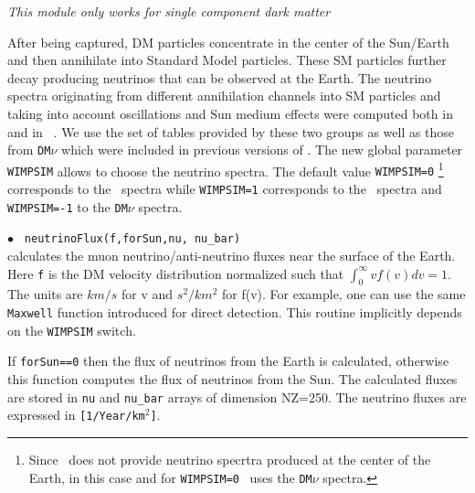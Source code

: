 \documentclass[12pt,a4paper]{article}
\begin{document}
\begin{center}
{\it This module only works for single component dark matter}
\end{center}

After being captured, DM particles concentrate in the center of the Sun/Earth and 
then  annihilate into Standard Model particles. These SM particles further decay producing neutrinos that can be 
observed at the Earth.  The neutrino spectra originating from
different annihilation channels into SM particles and
taking into account oscillations  and Sun medium effects were 
computed both in
\wimpsim~\cite{Blennow:2007tw} and in 
\pppc~\cite{Baratella:2013fya}. We use the set of tables
provided by these two groups as well as  those from  {\tt DM$\nu$}
\cite{Cirelli:2005gh}  which were included in previous versions of \micro.
The new global parameter {\tt WIMPSIM}  allows to
choose  the   neutrino spectra. The default value  {\tt WIMPSIM=0} \footnote{Since \pppc\ does not provide neutrino specrtra produced at the center of the
Earth, in this case  and for {\tt WIMPSIM=0} \micro\ uses the {\tt DM$\nu$} spectra.}
corresponds to the \pppc\ spectra while  {\tt WIMPSIM=1} corresponds to the
\wimpsim\  spectra and  {\tt WIMPSIM=-1}  to the 
 {\tt DM$\nu$} spectra. 
  
  
\noindent
$\bullet$ \verb| neutrinoFlux(f,forSun,nu, nu_bar)|\\
calculates the muon neutrino/anti-neutrino  fluxes  near the surface of the Earth. 
Here  \verb|f|  is  the DM velocity distribution   normalized such that 
$ \int_0^{\infty} v f(v) dv =1$. The units  are $km/s$ for v and $s^2/km^2$ for  
f(v).  For example,   one can use the same  \verb|Maxwell| 
function introduced for direct detection.  This routine implicitly depends on the {\tt WIMPSIM} switch.
  
  If {\tt forSun==0} then the flux of neutrinos from the Earth is calculated, otherwise this function computes the flux of neutrinos from the Sun.  The calculated fluxes are stored in {\tt nu} and {\tt nu\_bar}  arrays of dimension NZ=250.  
The neutrino fluxes are expressed in \verb|[1/Year/km|$^2$\verb|]|.
\end{document}
